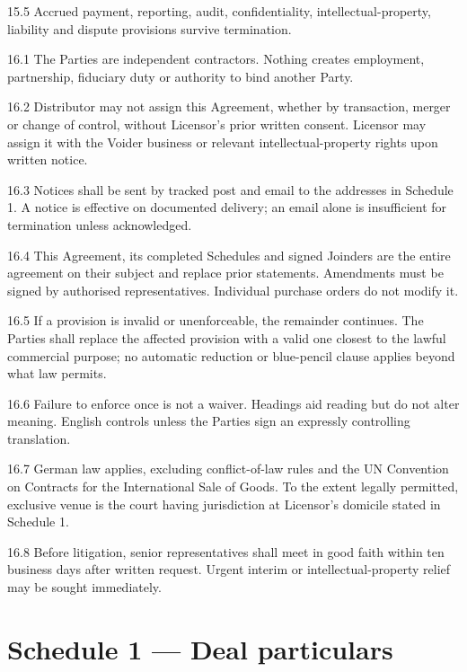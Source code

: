 \documentclass[11pt,a4paper]{article}
\newcommand{\articleheading}[2]{%
  \par\medskip{\large\bfseries\color{voiderblue}#1\quad #2}\par\smallskip
}
\begin{document}
15.5 Accrued payment, reporting, audit, confidentiality, intellectual-property, liability and dispute provisions survive termination.

\articleheading{16.}{General terms}

16.1 The Parties are independent contractors. Nothing creates employment, partnership, fiduciary duty or authority to bind another Party.

16.2 Distributor may not assign this Agreement, whether by transaction, merger or change of control, without Licensor's prior written consent. Licensor may assign it with the Voider business or relevant intellectual-property rights upon written notice.

16.3 Notices shall be sent by tracked post and email to the addresses in Schedule 1. A notice is effective on documented delivery; an email alone is insufficient for termination unless acknowledged.

16.4 This Agreement, its completed Schedules and signed Joinders are the entire agreement on their subject and replace prior statements. Amendments must be signed by authorised representatives. Individual purchase orders do not modify it.

16.5 If a provision is invalid or unenforceable, the remainder continues. The Parties shall replace the affected provision with a valid one closest to the lawful commercial purpose; no automatic reduction or blue-pencil clause applies beyond what law permits.

16.6 Failure to enforce once is not a waiver. Headings aid reading but do not alter meaning. English controls unless the Parties sign an expressly controlling translation.

16.7 German law applies, excluding conflict-of-law rules and the UN Convention on Contracts for the International Sale of Goods. To the extent legally permitted, exclusive venue is the court having jurisdiction at Licensor's domicile stated in Schedule 1.

16.8 Before litigation, senior representatives shall meet in good faith within ten business days after written request. Urgent interim or intellectual-property relief may be sought immediately.

\newpage
\section*{Schedule 1 --- Deal particulars}
\end{document}
